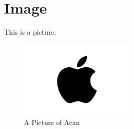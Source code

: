 \documentclass{article}
\begin{document}
	\section{Image}	

	\par This is a picture.

	\begin{figure}[htbp]
		\centering
		\includegraphics[width=0.5\textwidth]{./img/Apple_Inc.png}
		\caption{A Picture of Acan}
	\end{figure}
\end{document}
